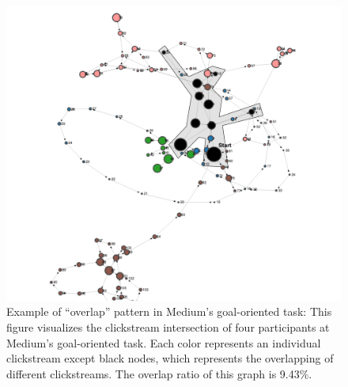 \begin{figure}[H]
    \centering
    \includegraphics[width=1\textwidth]{figures/overlap1}
    \caption{Example of ``overlap'' pattern in Medium's goal-oriented task: 
    This figure visualizes the clickstream intersection 
    of four participants at Medium's goal-oriented task. 
    Each color represents an individual clickstream except black nodes, 
    which represents the overlapping of different clickstreams.
    The overlap ratio of this graph is 9.43\%.}
    \label{fig:overlap-example-1}
\end{figure}

